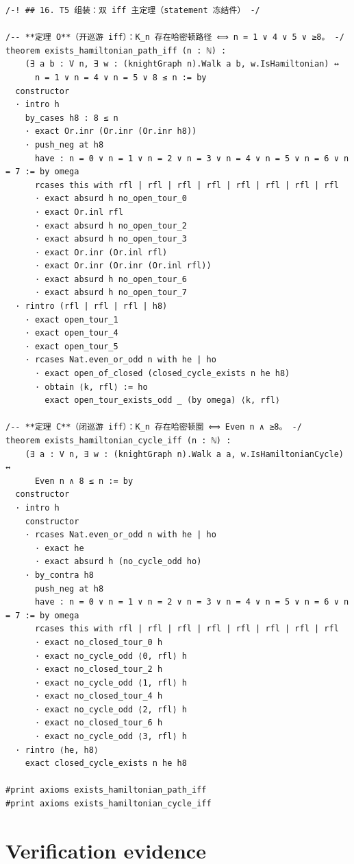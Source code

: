 \documentclass[11pt]{article}
\begin{document}
\begin{lstlisting}[caption={Verbatim lines 2577--2633: the assembly of both
iff theorems from the stage lemmas, followed by the two closing
\texttt{\#print axioms} commands.},label={lst:proof-assembly}]
/-! ## 16. T5 组装：双 iff 主定理（statement 冻结件） -/

/-- **定理 O**（开巡游 iff）：K_n 存在哈密顿路径 ⟺ n = 1 ∨ 4 ∨ 5 ∨ ≥8。 -/
theorem exists_hamiltonian_path_iff (n : ℕ) :
    (∃ a b : V n, ∃ w : (knightGraph n).Walk a b, w.IsHamiltonian) ↔
      n = 1 ∨ n = 4 ∨ n = 5 ∨ 8 ≤ n := by
  constructor
  · intro h
    by_cases h8 : 8 ≤ n
    · exact Or.inr (Or.inr (Or.inr h8))
    · push_neg at h8
      have : n = 0 ∨ n = 1 ∨ n = 2 ∨ n = 3 ∨ n = 4 ∨ n = 5 ∨ n = 6 ∨ n = 7 := by omega
      rcases this with rfl | rfl | rfl | rfl | rfl | rfl | rfl | rfl
      · exact absurd h no_open_tour_0
      · exact Or.inl rfl
      · exact absurd h no_open_tour_2
      · exact absurd h no_open_tour_3
      · exact Or.inr (Or.inl rfl)
      · exact Or.inr (Or.inr (Or.inl rfl))
      · exact absurd h no_open_tour_6
      · exact absurd h no_open_tour_7
  · rintro (rfl | rfl | rfl | h8)
    · exact open_tour_1
    · exact open_tour_4
    · exact open_tour_5
    · rcases Nat.even_or_odd n with he | ho
      · exact open_of_closed (closed_cycle_exists n he h8)
      · obtain ⟨k, rfl⟩ := ho
        exact open_tour_exists_odd _ (by omega) ⟨k, rfl⟩

/-- **定理 C**（闭巡游 iff）：K_n 存在哈密顿圈 ⟺ Even n ∧ ≥8。 -/
theorem exists_hamiltonian_cycle_iff (n : ℕ) :
    (∃ a : V n, ∃ w : (knightGraph n).Walk a a, w.IsHamiltonianCycle) ↔
      Even n ∧ 8 ≤ n := by
  constructor
  · intro h
    constructor
    · rcases Nat.even_or_odd n with he | ho
      · exact he
      · exact absurd h (no_cycle_odd ho)
    · by_contra h8
      push_neg at h8
      have : n = 0 ∨ n = 1 ∨ n = 2 ∨ n = 3 ∨ n = 4 ∨ n = 5 ∨ n = 6 ∨ n = 7 := by omega
      rcases this with rfl | rfl | rfl | rfl | rfl | rfl | rfl | rfl
      · exact no_closed_tour_0 h
      · exact no_cycle_odd ⟨0, rfl⟩ h
      · exact no_closed_tour_2 h
      · exact no_cycle_odd ⟨1, rfl⟩ h
      · exact no_closed_tour_4 h
      · exact no_cycle_odd ⟨2, rfl⟩ h
      · exact no_closed_tour_6 h
      · exact no_cycle_odd ⟨3, rfl⟩ h
  · rintro ⟨he, h8⟩
    exact closed_cycle_exists n he h8

#print axioms exists_hamiltonian_path_iff
#print axioms exists_hamiltonian_cycle_iff
\end{lstlisting}

\section{Verification evidence}
\end{document}
